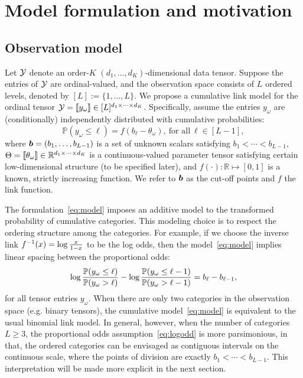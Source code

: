 \documentclass{article}
\theoremstyle{plain}
\theoremstyle{definition}
\begin{document}
\section{Model formulation and motivation}
\subsection{Observation model}
\vspace{-.1cm}
Let $\mathcal{Y}$ denote an order-$K$ $(d_1,\ldots,d_K)$-dimensional data tensor. Suppose the entries of $\mathcal{Y}$ are ordinal-valued, and the observation space consists of $L$ ordered levels, denoted by $[L]:=\{1,\ldots,L\}$. We propose a cumulative link model for the ordinal tensor $\mathcal{Y}=\llbracket y_\omega \rrbracket\in[L]^{d_1\times \cdots\times d_K}$. Specifically, assume the entries $y_\omega$ are (conditionally) independently distributed with cumulative probabilities:
\begin{equation}\label{eq:model}
\mathbb{P}(y_\omega\leq \ell)=f(b_\ell-\theta_\omega),\ \text{for all}\ \ell\in[L-1],
\end{equation}
where $\bm{b}=(b_1,\ldots,b_{L-1})$ is a set of unknown scalars satisfying $b_1<\cdots <b_{L-1}$, $\Theta=\llbracket \theta_\omega \rrbracket\in\mathbb{R}^{d_1\times \cdots \times d_K}$ is a continuous-valued parameter tensor satisfying certain low-dimensional structure (to be specified later), and $f(\cdot)\colon \mathbb{R}\mapsto[0,1]$ is a known, strictly increasing function. We refer to $\bm{b}$ as the cut-off points and $f$ the link function.

The formulation~\eqref{eq:model} imposes an additive model to the transformed probability of cumulative categories. This modeling choice is to respect the ordering structure among the categories. For example, if we choose the inverse link $f^{-1}(x)=\log {x\over 1-x}$ to be the log odds, then the model~\eqref{eq:model} implies linear spacing between the proportional odds:
\begin{equation}\label{eq:logodd}
\log {\mathbb{P}(y_{\omega}\leq \ell) \over \mathbb{P}(y_\omega >  \ell) } - \log {\mathbb{P}(y_{\omega}\leq {\ell-1}) \over \mathbb{P}(y_\omega >  {\ell-1}) } = b_\ell-b_{\ell-1},
\end{equation}
for all tensor entries $y_\omega$. When there are only two categories in the observation space (e.g. binary tensors), the cumulative model~\eqref{eq:model} is equivalent to the usual binomial link model. In general, however, when the number of categories $L\geq 3$, the proportional odds assumption~\eqref{eq:logodd} is more parsimonious, in that, the ordered categories can be envisaged as contiguous intervals on the continuous scale, where the points of division are exactly $b_1<\cdots <b_{L-1}$. This interpretation will be made more explicit in the next section.
\end{document}
